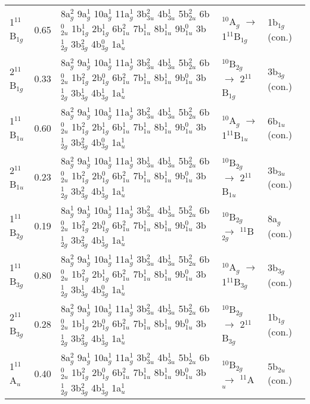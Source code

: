 \begin{refsection}
\begin{center}
\begin{landscape}
\begin{longtable}{@{\extracolsep{\fill}}lllll}
	1$^{11}$B$_{1g}$ & 0.65 & 8a$_g^2$ 9a$_g^1$ 10a$_g^1$ 11a$_g^1$ 3b$_{3u}^2$ 4b$_{3u}^1$ 5b$_{2u}^2$ 6b$_{2u}^0$ 1b$_{1g}^1$ 2b$_{1g}^1$ 6b$_{1u}^2$ 7b$_{1u}^1$ 8b$_{1u}^1$ 9b$_{1u}^0$ 3b$_{2g}^1$ 3b$_{3g}^2$ 4b$_{3g}^0$ 1a$_u^1$ & $^{10}$A$_g$     $\longrightarrow$ 1$^{11}$B$_{1g}$ & 1b$_{1g}$ (con.) \\
	2$^{11}$B$_{1g}$ & 0.33 & 8a$_g^2$ 9a$_g^1$ 10a$_g^1$ 11a$_g^1$ 3b$_{3u}^2$ 4b$_{3u}^1$ 5b$_{2u}^2$ 6b$_{2u}^0$ 1b$_{1g}^2$ 2b$_{1g}^0$ 6b$_{1u}^2$ 7b$_{1u}^1$ 8b$_{1u}^1$ 9b$_{1u}^0$ 3b$_{2g}^1$ 3b$_{3g}^1$ 4b$_{3g}^1$ 1a$_u^1$ & $^{10}$B$_{2g}$  $\longrightarrow$ 2$^{11}$B$_{1g}$ & 3b$_{3g}$ (con.) \\
	1$^{11}$B$_{1u}$ & 0.60 & 8a$_g^2$ 9a$_g^1$ 10a$_g^1$ 11a$_g^1$ 3b$_{3u}^2$ 4b$_{3u}^1$ 5b$_{2u}^2$ 6b$_{2u}^0$ 1b$_{1g}^2$ 2b$_{1g}^1$ 6b$_{1u}^1$ 7b$_{1u}^1$ 8b$_{1u}^1$ 9b$_{1u}^0$ 3b$_{2g}^1$ 3b$_{3g}^2$ 4b$_{3g}^0$ 1a$_u^1$ & $^{10}$A$_g$     $\longrightarrow$ 1$^{11}$B$_{1u}$ & 6b$_{1u}$ (con.) \\
	2$^{11}$B$_{1u}$ & 0.23 & 8a$_g^2$ 9a$_g^1$ 10a$_g^1$ 11a$_g^1$ 3b$_{3u}^1$ 4b$_{3u}^1$ 5b$_{2u}^2$ 6b$_{2u}^0$ 1b$_{1g}^2$ 2b$_{1g}^0$ 6b$_{1u}^2$ 7b$_{1u}^1$ 8b$_{1u}^1$ 9b$_{1u}^0$ 3b$_{2g}^1$ 3b$_{3g}^2$ 4b$_{3g}^1$ 1a$_u^1$ & $^{10}$B$_{2g}$    $\longrightarrow$ 2$^{11}$B$_{1u}$ & 3b$_{3u}$ (con.) \\
	1$^{11}$B$_{2g}$ & 0.19 & 8a$_g^1$ 9a$_g^1$ 10a$_g^1$ 11a$_g^1$ 3b$_{3u}^2$ 4b$_{3u}^1$ 5b$_{2u}^2$ 6b$_{2u}^0$ 1b$_{1g}^2$ 2b$_{1g}^0$ 6b$_{1u}^2$ 7b$_{1u}^1$ 8b$_{1u}^1$ 9b$_{1u}^0$ 3b$_{2g}^1$ 3b$_{3g}^2$ 4b$_{3g}^1$ 1a$_u^1$ & $^{10}$B$_{2g}$    $\longrightarrow$  $^{11}$B$_{2g}$ & 8a$_g$ (con.)  \\
	1$^{11}$B$_{3g}$ & 0.80 & 8a$_g^2$ 9a$_g^1$ 10a$_g^1$ 11a$_g^1$ 3b$_{3u}^2$ 4b$_{3u}^1$ 5b$_{2u}^2$ 6b$_{2u}^0$ 1b$_{1g}^2$ 2b$_{1g}^1$ 6b$_{1u}^2$ 7b$_{1u}^1$ 8b$_{1u}^1$ 9b$_{1u}^0$ 3b$_{2g}^1$ 3b$_{3g}^1$ 4b$_{3g}^0$ 1a$_u^1$ & $^{10}$A$_g$     $\longrightarrow$ 1$^{11}$B$_{3g}$ & 3b$_{3g}$ (con.) \\
	2$^{11}$B$_{3g}$ & 0.28 & 8a$_g^2$ 9a$_g^1$ 10a$_g^1$ 11a$_g^1$ 3b$_{3u}^2$ 4b$_{3u}^1$ 5b$_{2u}^2$ 6b$_{2u}^0$ 1b$_{1g}^1$ 2b$_{1g}^0$ 6b$_{1u}^2$ 7b$_{1u}^1$ 8b$_{1u}^1$ 9b$_{1u}^0$ 3b$_{2g}^1$ 3b$_{3g}^2$ 4b$_{3g}^1$ 1a$_u^1$ & $^{10}$B$_{2g}$  $\longrightarrow$ 2$^{11}$B$_{3g}$ & 1b$_{1g}$ (con.)\\
	1$^{11}$A$_{u}$ & 0.40 & 8a$_g^2$ 9a$_g^1$ 10a$_g^1$ 11a$_g^1$ 3b$_{3u}^2$ 4b$_{3u}^1$ 5b$_{2u}^1$ 6b$_{2u}^0$ 1b$_{1g}^2$ 2b$_{1g}^0$ 6b$_{1u}^2$ 7b$_{1u}^1$ 8b$_{1u}^1$ 9b$_{1u}^0$ 3b$_{2g}^1$ 3b$_{3g}^2$ 4b$_{3g}^1$ 1a$_u^1$ & $^{10}$B$_{2g}$  $\longrightarrow$  $^{11}$A$_{u}$ & 5b$_{2u}$ (con.)
	\label{table:leadconfig}
\end{longtable}                                                                          
\end{landscape}
\end{center}






\end{refsection}
